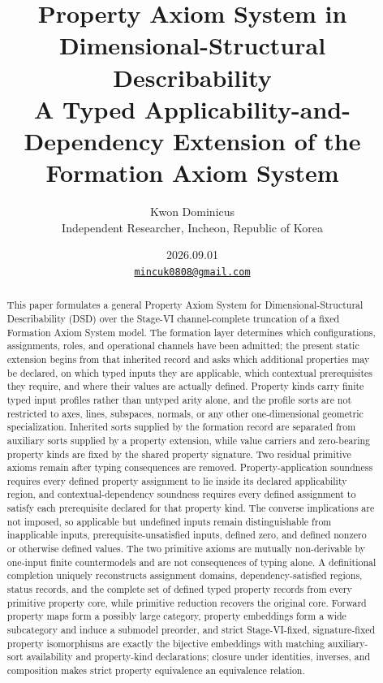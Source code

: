 \documentclass[11pt]{article}
\title{Property Axiom System in Dimensional-Structural Describability\\[0.35em]
\large A Typed Applicability-and-Dependency Extension of the Formation Axiom System}
\author{Kwon Dominicus\\\small Independent Researcher, Incheon, Republic of Korea}
\date{2026.09.01\\[0.4em]\small\href{mailto:mincuk0808@gmail.com}{\texttt{mincuk0808@gmail.com}}}
\theoremstyle{definition}
\theoremstyle{remark}
\begin{document}
\maketitle

\begin{abstract}
This paper formulates a general Property Axiom System for Dimensional-Structural Describability (DSD) over the Stage-VI channel-complete truncation of a fixed Formation Axiom System model.
The formation layer determines which configurations, assignments, roles, and operational channels have been admitted; the present static extension begins from that inherited record and asks which additional properties may be declared, on which typed inputs they are applicable, which contextual prerequisites they require, and where their values are actually defined.
Property kinds carry finite typed input profiles rather than untyped arity alone, and the profile sorts are not restricted to axes, lines, subspaces, normals, or any other one-dimensional geometric specialization.
Inherited sorts supplied by the formation record are separated from auxiliary sorts supplied by a property extension, while value carriers and zero-bearing property kinds are fixed by the shared property signature.
Two residual primitive axioms remain after typing consequences are removed.
Property-application soundness requires every defined property assignment to lie inside its declared applicability region, and contextual-dependency soundness requires every defined assignment to satisfy each prerequisite declared for that property kind.
The converse implications are not imposed, so applicable but undefined inputs remain distinguishable from inapplicable inputs, prerequisite-unsatisfied inputs, defined zero, and defined nonzero or otherwise defined values.
The two primitive axioms are mutually non-derivable by one-input finite countermodels and are not consequences of typing alone.
A definitional completion uniquely reconstructs assignment domains, dependency-satisfied regions, status records, and the complete set of defined typed property records from every primitive property core, while primitive reduction recovers the original core.
Forward property maps form a possibly large category, property embeddings form a wide subcategory and induce a submodel preorder, and strict Stage-VI-fixed, signature-fixed property isomorphisms are exactly the bijective embeddings with matching auxiliary-sort availability and property-kind declarations; closure under identities, inverses, and composition makes strict property equivalence an equivalence relation.

\end{abstract}
\end{document}
